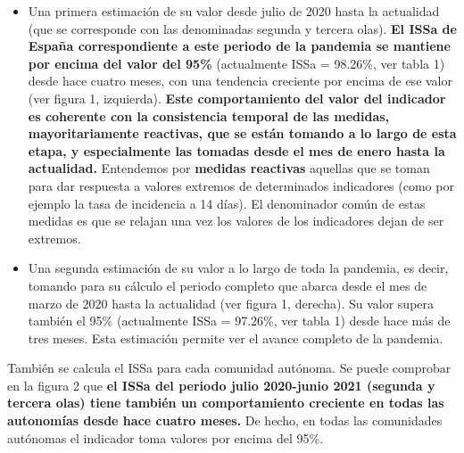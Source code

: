 \documentclass[
  11pt,
]{article}
\begin{document}
\begin{itemize}
\item
  Una primera estimación de su valor desde julio de 2020 hasta la
  actualidad (que se corresponde con las denominadas segunda y tercera
  olas). \textbf{El ISSa de España correspondiente a este periodo de la
  pandemia se mantiene por encima del valor del 95\%} (actualmente ISSa
  = 98.26\%, ver tabla 1) desde hace cuatro meses, con una tendencia
  creciente por encima de ese valor (ver figura 1, izquierda).
  \textbf{Este comportamiento del valor del indicador es coherente con
  la consistencia temporal de las medidas, mayoritariamente reactivas,
  que se están tomando a lo largo de esta etapa, y especialmente las
  tomadas desde el mes de enero hasta la actualidad.} Entendemos por
  \textbf{medidas reactivas} aquellas que se toman para dar respuesta a
  valores extremos de determinados indicadores (como por ejemplo la tasa
  de incidencia a 14 días). El denominador común de estas medidas es que
  se relajan una vez los valores de los indicadores dejan de ser
  extremos.
\item
  Una segunda estimación de su valor a lo largo de toda la pandemia, es
  decir, tomando para su cálculo el periodo completo que abarca desde el
  mes de marzo de 2020 hasta la actualidad (ver figura 1, derecha). Su
  valor supera también el 95\% (actualmente ISSa = 97.26\%, ver tabla 1)
  desde hace más de tres meses. Esta estimación permite ver el avance
  completo de la pandemia.
\end{itemize}

También se calcula el ISSa para cada comunidad autónoma. Se puede
comprobar en la figura 2 que \textbf{el ISSa del periodo julio
2020-junio 2021 (segunda y tercera olas) tiene también un comportamiento
creciente en todas las autonomías desde hace cuatro meses.} De hecho, en
todas las comunidades autónomas el indicador toma valores por encima del
95\%.
\end{document}
